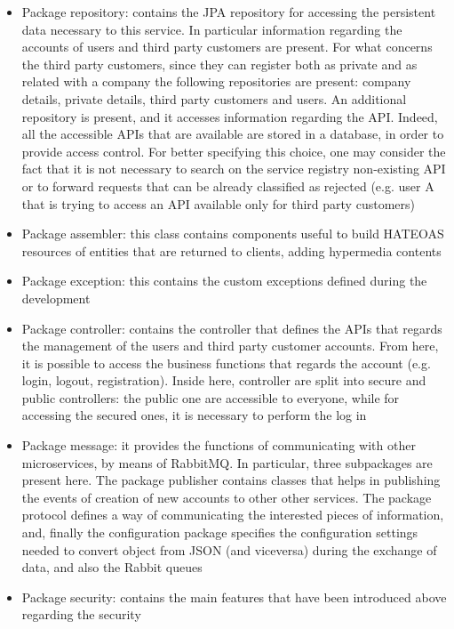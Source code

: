 \begin{itemize}
\item Package repository: contains the JPA repository for accessing the persistent data necessary to this
service. 
In particular information regarding the accounts of users and third party customers are present. For what concerns the third party customers,
since they can register both as private and as related with a company the following repositories are present: company details, private
details, third party customers and users. An additional repository is present, and it accesses information regarding the API. Indeed, all
the accessible APIs that are available are stored in a database, in order to provide access control. For better specifying this choice, 
one may consider the fact that it is not necessary to search on the service registry non-existing API or to forward requests that can
be already classified as rejected (e.g. user A that is trying to access an API available only for third party customers)
\item Package assembler: this class contains components useful to build HATEOAS resources of entities that are returned to clients, adding
hypermedia contents
\item Package exception: this contains the custom exceptions defined during the development
\item Package controller: contains the controller that defines the APIs that regards the management of the users and third party customer
accounts. From here, it is possible to access the business functions that regards the account (e.g. login, logout, registration). Inside here,
controller are split into secure and public controllers: the public one are accessible to everyone, while for accessing the secured ones,
it is necessary to perform the log in
\item Package message: it provides the functions of communicating with other microservices, by means of RabbitMQ. In particular, three
subpackages are present here. The package publisher contains classes that helps in publishing the events of creation of new accounts to other
other services. The package protocol defines a way of communicating the interested pieces of information, and, finally the configuration
package specifies the configuration settings needed to convert object from JSON (and viceversa) during the exchange of data, and also
the Rabbit queues  
\item Package security: contains the main features that have been introduced above regarding the security 

\end{itemize}

